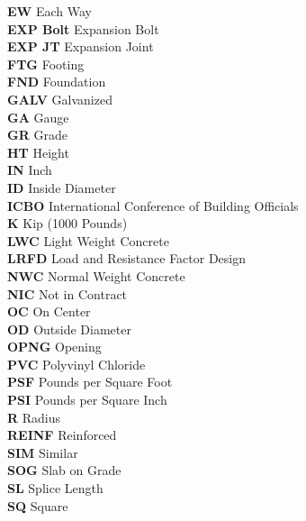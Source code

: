 \begin{tabbing}
    \indent\textbf{EW}       \>  {Each Way}\\
    \indent\textbf{EXP Bolt} \>  {Expansion Bolt}\\
    \indent\textbf{EXP JT}   \>  {Expansion Joint}\\
    \indent\textbf{FTG}      \>  {Footing}\\
    \indent\textbf{FND}      \>  {Foundation}\\
    \indent\textbf{GALV}     \>  {Galvanized}\\
    \indent\textbf{GA}       \>  {Gauge}\\
    \indent\textbf{GR}       \>  {Grade}\\
    \indent\textbf{HT}       \>  {Height}\\
    \indent\textbf{IN}       \>  {Inch}\\
    \indent\textbf{ID}       \>  {Inside Diameter}\\
    \indent\textbf{ICBO}     \>  {International Conference of Building Officials}\\
    \indent\textbf{K}        \>  {Kip (1000 Pounds)}\\
    \indent\textbf{LWC}      \>  {Light Weight Concrete}\\
    \indent\textbf{LRFD}     \>  {Load and Resistance Factor Design}\\
    \indent\textbf{NWC}      \>  {Normal Weight Concrete}\\
    \indent\textbf{NIC}      \>  {Not in Contract}\\
    \indent\textbf{OC}       \>  {On Center}\\
    \indent\textbf{OD}       \>  {Outside Diameter}\\
    \indent\textbf{OPNG}     \>  {Opening}\\
    \indent\textbf{PVC}      \>  {Polyvinyl Chloride}\\
    \indent\textbf{PSF}      \>  {Pounds per Square Foot}\\
    \indent\textbf{PSI}      \>  {Pounds per Square Inch}\\
    \indent\textbf{R}        \>  {Radius}\\
    \indent\textbf{REINF}    \>  {Reinforced}\\
    \indent\textbf{SIM}      \>  {Similar}\\
    \indent\textbf{SOG}      \>  {Slab on Grade}\\
    \indent\textbf{SL}       \>  {Splice Length}\\
    \indent\textbf{SQ}       \>  {Square}\\

\end{tabbing}
